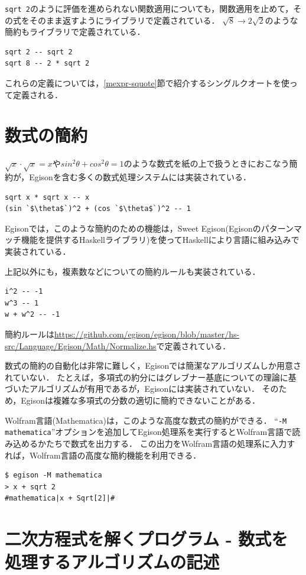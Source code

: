 \lstinline{sqrt 2}のように評価を進められない関数適用についても，関数適用を止めて，その式をそのまま返すようにライブラリで定義されている．
$\sqrt{8} \rightarrow 2 \sqrt{2}$のような簡約もライブラリで定義されている．
\begin{lstlisting}[language=egison,numbers=none]
sqrt 2 -- sqrt 2
sqrt 8 -- 2 * sqrt 2
\end{lstlisting}
これらの定義については，\ref{mexpr-squote}節で紹介するシングルクオートを使って定義される．


\section{数式の簡約}\label{cas-simplify}

$\sqrt{x} \cdot \sqrt{x} = x$や$sin^2\theta + cos^2\theta = 1$のような数式を紙の上で扱うときにおこなう簡約が，Egisonを含む多くの数式処理システムには実装されている．
\begin{lstlisting}[language=egison,numbers=none]
sqrt x * sqrt x -- x
(sin `$\theta$`)^2 + (cos `$\theta$`)^2 -- 1
\end{lstlisting}
Egisonでは，このような簡約のための機能は，Sweet Egison(Egisonのパターンマッチ機能を提供するHaskellライブラリ)を使ってHaskellにより言語に組み込みで実装されている．

上記以外にも，複素数などについての簡約ルールも実装されている．
\begin{lstlisting}[language=egison,numbers=none]
i^2 -- -1
w^3 -- 1  
w + w^2 -- -1  
\end{lstlisting}
簡約ルールは\url{https://github.com/egison/egison/blob/master/hs-src/Language/Egison/Math/Normalize.hs}で定義されている．

数式の簡約の自動化は非常に難しく，Egisonでは簡潔なアルゴリズムしか用意されていない．
たとえば，多項式の約分にはグレブナー基底についての理論に基づいたアルゴリズムが有用であるが，Egisonには実装されていない．
そのため，Egisonは複雑な多項式の分数の適切に簡約できないことがある．

Wolfram言語(Mathematica)は，このような高度な数式の簡約ができる．
``\texttt{-M mathematica}''オプションを追加してEgison処理系を実行するとWolfram言語で読み込めるかたちで数式を出力する．
この出力をWolfram言語の処理系に入力すれば，Wolfram言語の高度な簡約機能を利用できる．
\begin{lstlisting}[language=egison,numbers=none]
$ egison -M mathematica
> x + sqrt 2
#mathematica|x + Sqrt[2]|#
\end{lstlisting}

\section{二次方程式を解くプログラム - 数式を処理するアルゴリズムの記述}\label{cas-quadratic}

